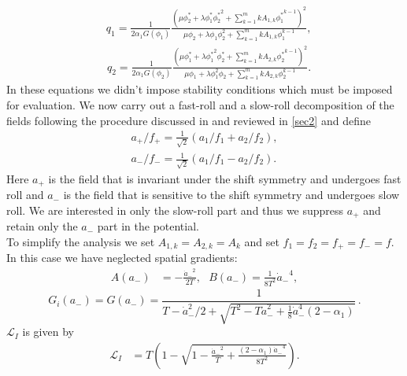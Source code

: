 \documentclass[a4paper,11pt]{article}
\def\non{\nonumber\\}
\def\non{\nonumber\\}
\begin{document}
  \begin{equation} \label{DisplayFormulaNumbered:eq.twoDBI.q.1}
  \begin{split}
    & q_1
    =\frac{1}{2\alpha_1G\left(\phi_1\right)}\frac{{\left(\mu \phi^*_2 + \lambda \phi^*_1 {\phi^*_2}^2+\sum_{k=1}^mk A_{1, k}{\phi^*_1}^{k-1}\right)}^2}{\mu \phi_2+\lambda \phi_1\phi_2^2 + \sum_{k=1}^mk A_{1, k}\phi_1^{k-1}},
  \end{split}
  \end{equation}
  \begin{equation} \label{DisplayFormulaNumbered:eq.twoDBI.q.2}
  \begin{split}
    & q_2
    =\frac{1}{2\alpha_1G\left(\phi_2\right)}\frac{{\left(\mu \phi^*_1 + \lambda {\phi^*_1}^2 \phi^*_2 + \sum_{k=1}^mk A_{2, k}{\phi^*_2}^{k-1}\right)}^2}{\mu \phi_1+\lambda \phi_1^2\phi_2 + \sum_{k=1}^mk A_{2, k}\phi_2^{k-1}}.
  \end{split}
  \end{equation}
  In these equations we didn't impose stability conditions which must be imposed for evaluation.
  We now carry out a fast-roll and a slow-roll decomposition of the fields following the procedure discussed in \cite{Nath:2017ihp} and reviewed in \ref{sec2} and define
  \begin{align} \label{eq.twoDBI.aPlusMinusFull}
    a_+/f_+={\frac{1}{\sqrt 2}}\left(a_1/f_1+a_2/f_2\right),\non
    a_-/f_-={\frac{1}{\sqrt 2}}\left(a_1/f_1-a_2/f_2\right).
  \end{align}
  Here $a_+$ is the field that  is invariant under the shift symmetry and  undergoes fast roll and $a_-$ is the field that is sensitive to the shift symmetry and undergoes slow roll. We are interested in only the slow-roll part
  and thus we suppress $a_+$ and retain only the $a_-$ part in the potential. \\
  To simplify the analysis we  set $A_{1,k} = A_{2,k} = A_k$ and set $f_1 = f_2 = f_+ = f_- = f$.
  In this case we have neglected spatial gradients:
  \begin{align}
    A( a_-)& = -\frac{{\dot{a}_-}^2}{2T},
    ~~~B(a_-) = \frac{1}{8 T^2}  {\dot a_-}^4,
    \label{const3}
  \end{align}
  \begin{equation}
    G_i\left(a_-\right)= G\left(a_-\right)
    = \frac{1}{ T- \dot a_-^2/2 + \sqrt{T^2- T \dot a_-^2 + \frac{1}{8} {\dot a}_{-}^4 \left(2 - \alpha_1\right)}}\,.
    \label{const5}
  \end{equation}
  $\mathcal{L}_I$ is given by
  \begin{align} \label{eq.axionLagrangian.I}
    \mathcal{L}_{I} &= T \left(1-\sqrt{1-\frac{{\dot a_{-}}^2}{T}+\frac{\left(2-\alpha_1\right){\dot a_{-}}^4}{8 T^2}} \right).
  \end{align}
\end{document}
